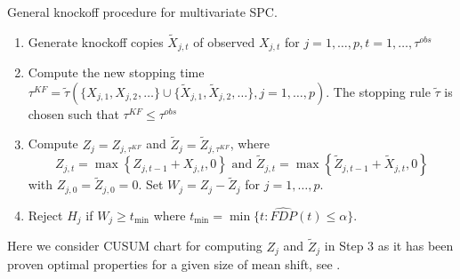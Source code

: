 \documentclass[]{interact}
\theoremstyle{plain}%
\theoremstyle{definition}
\theoremstyle{remark}
\providecommand{\tightlist}{%
  \setlength{\itemsep}{0pt}\setlength{\parskip}{0pt}}
\begin{document}
General knockoff procedure for multivariate SPC.
\begin{enumerate}
\tightlist
\item Generate knockoff copies $\tilde X_{j,t}$ of observed $X_{j,t}$ for $j=1, \ldots, p, t = 1, \ldots, \tau^{obs}$
\item Compute the new stopping time $\tau^{KF}=\tilde \tau (\{ X_{j,1}, X_{j,2}, \ldots\} \cup \{ \tilde X_{j,1},\tilde X_{j,2},\ldots\}, j=1, \ldots, p)$. The stopping rule $\tilde \tau$ is chosen such that $\tau^{KF} \le \tau^{obs}$
\item Compute $Z_j = Z_{j,\tau^{KF}}$ and $\tilde Z_j =\tilde Z_{j,\tau^{KF}}$, where
$$
Z_{j,t} = \max \left \{Z_{j,t-1} + X_{j,t}, 0 \right \} \text{  and  } \tilde Z_{j,t} = \max \left \{\tilde Z_{j,t-1} + \tilde X_{j,t}, 0 \right \}
$$
with $Z_{j,0} = \tilde Z_{j,0} = 0$. Set $W_j=Z_j - \tilde Z_j$ for $j=1, \ldots, p$.
\item Reject $H_j$ if $W_j \ge t_{\min}$ where $t_{\min} = \min \{t : \widehat{FDP}(t) \le \alpha\}$.
 \end{enumerate}

Here we consider CUSUM chart for computing $Z_j$ and $\tilde Z_j$ in Step 3 as it has been proven optimal properties for a given size of mean shift, see \cite{bagshaw1975influence}.
\end{document}
